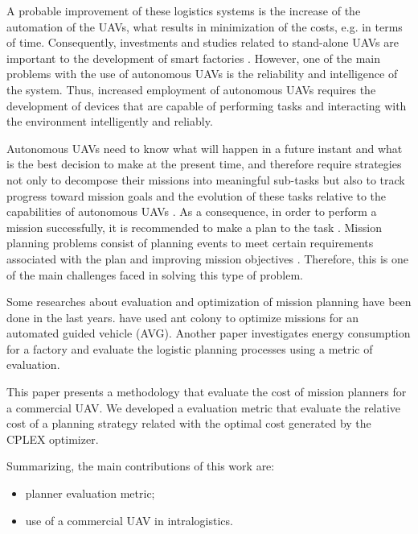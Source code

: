 \documentclass[conference,harvard,brazil,english]{sbatex}
\begin{document}
A probable improvement of these logistics systems is the increase of the automation of the UAVs, what results in minimization of the costs, e.g. in terms of time. Consequently, investments and studies related to stand-alone UAVs are important to the development of smart factories \cite{hern2014dhl}. However, one of the main problems with the use of autonomous UAVs is the reliability and intelligence of the system. Thus, increased employment of autonomous UAVs requires the development of devices that are capable of performing tasks and interacting with the environment intelligently and reliably.

Autonomous UAVs need to know what will happen in a future instant and what is the best decision to make at the present time, and therefore require strategies not only to decompose their missions into meaningful sub-tasks but also to track progress toward mission goals and the evolution of these tasks relative to the capabilities of autonomous UAVs \cite{finn2012developments}. As a consequence, in order to perform a mission successfully, it is recommended to make a plan to the task \cite{successplan}. Mission planning problems consist of planning events to meet certain requirements associated with the plan and improving mission objectives \cite{krozel1988search}. Therefore, this is one of the main challenges faced in solving this type of problem.

Some researches about evaluation and optimization of mission planning have been done in the last years.  have used ant colony to optimize missions for an automated guided vehicle (AVG). Another paper investigates energy consumption for a factory and evaluate the logistic planning processes using a metric of evaluation\cite{muller2012analyzing}.

This paper presents a methodology that evaluate the cost of mission planners for a commercial UAV. We developed a evaluation metric that evaluate the relative cost of a planning strategy related with the optimal cost generated by the CPLEX optimizer. %

Summarizing, the main contributions of this work are:
\begin{itemize}
\item planner evaluation metric;
\item use of a commercial UAV in intralogistics.
\end{itemize}
\end{document}
